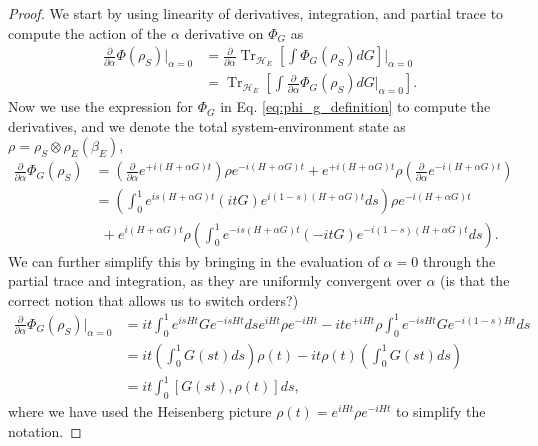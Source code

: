 \documentclass{article}
\newcommand{\parens}[1]{\left( #1 \right)}
\newcommand{\brackets}[1]{\left[ #1 \right]}
\DeclareMathOperator{\Tr}{Tr}
\newcommand{\partrace}[2]{\Tr_{#1} \brackets{ #2 }}
\begin{document}
\begin{proof}
    We start by using linearity of derivatives, integration, and partial trace to compute the action of the $\alpha$ derivative on $\Phi_G$ as
    \begin{align}
        \frac{\partial}{\partial \alpha} \Phi(\rho_S) \bigg|_{\alpha = 0} &= \frac{\partial}{\partial \alpha} \partrace{\mathcal{H}_E}{\int \Phi_G(\rho_S) dG} \bigg|_{\alpha = 0} \\
         &= \partrace{\mathcal{H}_E}{\int \frac{\partial}{\partial \alpha} \Phi_G(\rho_S) dG \bigg|_{\alpha = 0} } .
    \end{align}
    Now we use the expression for $\Phi_G$ in Eq. \eqref{eq:phi_g_definition} to compute the derivatives, and we denote the total system-environment state as $\rho = \rho_S \otimes \rho_E(\beta_E)$,
    \begin{align}
        \frac{\partial}{\partial \alpha} \Phi_G (\rho_S) &= \parens{\frac{\partial}{\partial \alpha} e^{+ i (H + \alpha G)t}} \rho e^{-i (H + \alpha G) t} + e^{+i (H + \alpha G)t} \rho \parens{\frac{\partial}{\partial \alpha} e^{- i (H + \alpha G)t}} \\
        &= \parens{\int_{0}^{1} e^{i s (H+\alpha G)t} (i t G) e^{i (1-s) (H+\alpha G)t} ds} \rho e^{-i(H+\alpha G)t} \nonumber \\
    &~ ~+ e^{i(H+\alpha G)t} \rho \parens{\int_{0}^1 e^{-i s (H+\alpha G) t} (- i t G) e^{-i (1-s) (H+\alpha G)t} ds}. \label{eq:first_order_alpha_derivative}
    \end{align}
    We can further simplify this by bringing in the evaluation of $\alpha = 0$ through the partial trace and integration, as they are uniformly convergent over $\alpha$ (is that the correct notion that allows us to switch orders?)
    \begin{align}
        \frac{\partial}{\partial \alpha} \Phi_G(\rho_S) \bigg|_{\alpha = 0} &= i t \int_0^1 e^{i s H t} G e^{-i s H t} ds e^{i H t} \rho e^{-i H t} - i t e^{+i H t} \rho \int_0^1 e^{-is H t} G e^{-i(1-s) Ht} ds \\
        &= i t \parens{\int_0^1 G(s t) ds} \rho(t) - it \rho(t) \parens{\int_0^1 G(s t) ds} \\
        &= i t \int_0^1 [G(s t), \rho(t)] ds,
    \end{align}
    where we have used the Heisenberg picture $\rho(t) = e^{i H t} \rho e^{-i H t}$ to simplify the notation.


\end{proof}
\end{document}
